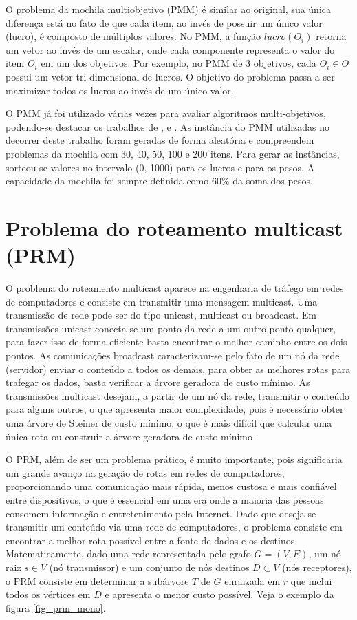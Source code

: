 O problema da mochila multiobjetivo (PMM) é similar ao original, sua única diferença está no fato de que cada item, ao invés de possuir um único valor (lucro), é composto de múltiplos valores. No PMM, a função $lucro(O_i)$ retorna um vetor ao invés de um escalar, onde cada componente representa o valor do item $O_i$ em um dos objetivos. Por exemplo, no PMM de 3 objetivos, cada $O_i \in O$ possui um vetor tri-dimensional de lucros. O objetivo do problema passa a ser maximizar todos os lucros ao invés de um único valor.

O PMM já foi utilizado várias vezes para avaliar algoritmos multi-objetivos, podendo-se destacar os trabalhos de \cite{Zitzler1999}, \cite{Zitzler2002} e \cite{Zhang2007}. As instância do PMM utilizadas no decorrer deste trabalho foram geradas de forma aleatória e compreendem problemas da mochila com 30, 40, 50, 100 e 200 itens. Para gerar as instâncias, sorteou-se valores no intervalo (0, 1000) para os lucros e para os pesos. A capacidade da mochila foi sempre definida como 60\% da soma dos pesos.  

\section{Problema do roteamento multicast (PRM)}
\label{section_problemas_prm}

O problema do roteamento multicast aparece na engenharia de tráfego em redes de computadores e consiste em transmitir uma mensagem multicast. Uma transmissão de rede pode ser do tipo unicast, multicast ou broadcast. Em transmissões unicast conecta-se um ponto da rede a um outro ponto qualquer, para fazer isso de forma eficiente basta encontrar o melhor caminho entre os dois pontos. As comunicações broadcast caracterizam-se pelo fato de um nó da rede (servidor) enviar o conteúdo a todos os demais, para obter as melhores rotas para trafegar os dados, basta verificar a árvore geradora de custo mínimo. As transmissões multicast desejam, a partir de um nó da rede, transmitir o conteúdo para alguns outros, o que apresenta maior complexidade, pois é necessário obter uma árvore de Steiner de custo mínimo, o que é mais difícil que calcular uma única rota ou construir a árvore geradora de custo mínimo \cite{Bueno2010}.

O PRM, além de ser um problema prático, é muito importante, pois significaria um grande avanço na geração de rotas em redes de computadores, proporcionando uma comunicação mais rápida, menos custosa e mais confiável entre dispositivos, o que é essencial em uma era onde a maioria das pessoas consomem informação e entretenimento pela Internet. Dado que deseja-se transmitir um conteúdo via uma rede de computadores, o problema consiste em encontrar a melhor rota possível entre a fonte de dados e os destinos. Matematicamente, dado uma rede representada pelo grafo $G=(V,E)$, um nó raiz $s \in V$ (nó transmissor) e um conjunto de nós destinos $D \subset V$ (nós receptores), o PRM consiste em determinar a subárvore $T$ de $G$ enraizada em $r$ que inclui todos os vértices em $D$ e apresenta o menor custo possível. Veja o exemplo da figura \ref{fig_prm_mono}.

